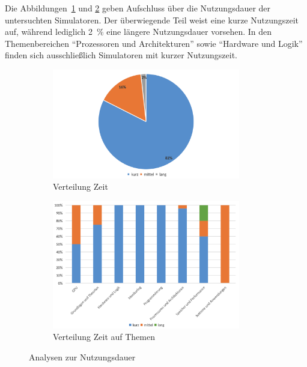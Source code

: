 Die Abbildungen~\ref{fig:12-zeit} und \ref{fig:13-vorwissen-thema} geben Aufschluss über die Nutzungsdauer der untersuchten Simulatoren. Der überwiegende Teil weist eine kurze Nutzungszeit auf, während lediglich 2~\% eine längere Nutzungsdauer vorsehen. In den Themenbereichen \enquote{Prozessoren und Architekturen} sowie \enquote{Hardware und Logik} finden sich ausschließlich Simulatoren mit kurzer Nutzungszeit.

\begin{figure}[!htbp]
    \centering
    \begin{subfigure}[b]{0.48\textwidth}
        \centering
        \includegraphics[width=0.90\textwidth]{graphics_sim/12-zeit.png}
        \caption{Verteilung Zeit}
        \label{fig:12-zeit}
    \end{subfigure}
    \hfill
    \begin{subfigure}[b]{0.48\textwidth}
        \centering
        \includegraphics[width=0.90\textwidth]{graphics_sim/13-zeit-thema.png}
        \caption{Verteilung Zeit auf Themen}
        \label{fig:13-vorwissen-thema}
    \end{subfigure}
    \caption{Analysen zur Nutzungsdauer}
    \label{fig:nutzungsdauer-gesamt}
\end{figure}

